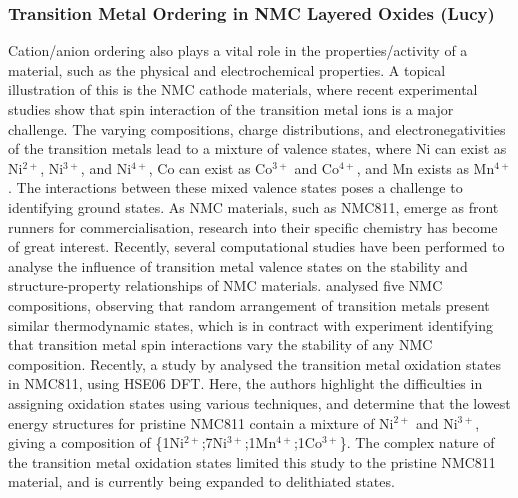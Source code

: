 \documentclass[../main.tex]{subfiles}
\begin{document}
\subsubsection{Transition Metal Ordering in NMC Layered Oxides (Lucy)}
\label{sec:TM_ordering_NMC}
Cation/anion ordering also plays a vital role in the properties/activity of a material, such as the physical and electrochemical properties. A topical illustration of this is the NMC cathode materials, where recent experimental studies show that spin interaction of the transition metal ions is a major challenge. \cite{duan2019insights, xiao2018insight} The varying compositions, charge distributions, and electronegativities of the transition metals lead to a mixture of valence states, where Ni can exist as Ni$^{2+}$, Ni$^{3+}$, and Ni$^{4+}$, Co can exist as Co$^{3+}$ and Co$^{4+}$, and Mn exists as Mn$^{4+}$. \cite{xiao2018insight} The interactions between these mixed valence states poses a challenge to identifying ground states. As NMC materials, such as NMC811, emerge as front runners for commercialisation, research into their specific chemistry has become of great interest. Recently, several computational studies have been performed to analyse the influence of transition metal valence states on the stability and structure-property relationships of NMC materials. \cite{sun2017electronic,dixit2017origin, hoang2016defect,dixit2017unraveling} \citeauthor{sun2017electronic} analysed five NMC compositions, observing that random arrangement of transition metals present similar thermodynamic states, which is in contract with experiment identifying that transition metal spin interactions vary the stability of any NMC composition. \cite{sun2017electronic}  Recently, a study by \citeauthor{rana} analysed the transition metal oxidation states in NMC811, using HSE06 DFT. Here, the authors highlight the difficulties in assigning oxidation states using various techniques, and determine that the lowest energy structures for pristine NMC811 contain a mixture of Ni$^{2+}$ and Ni$^{3+}$, giving a composition of \{1Ni$^{2+}$;7Ni$^{3+}$;1Mn$^{4+}$;1Co$^{3+}$\}. \cite{rana} The complex nature of the transition metal oxidation states limited this study to the pristine NMC811 material, and is currently being expanded to delithiated states.
\end{document}
